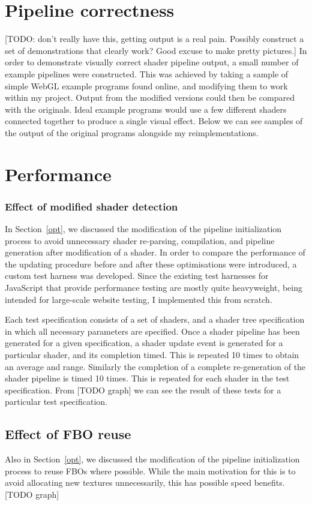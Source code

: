 \documentclass[12pt,twoside,notitlepage]{report}
\begin{document}
\section{Pipeline correctness}
[TODO: don't really have this, getting output is a real pain. Possibly construct a set of demonstrations that clearly work? Good excuse to make pretty pictures.]
In order to demonstrate visually correct shader pipeline output, a small number of example pipelines were constructed. This was achieved by taking a sample of simple WebGL example programs found online, and modifying them to work within my project. Output from the modified versions could then be compared with the originals. Ideal example programs would use a few different shaders connected together to produce a single visual effect. Below we can see samples of the output of the original programs alongside my reimplementations.

\section{Performance}
\subsubsection{Effect of modified shader detection}
In Section~\ref{opt}, we discussed the modification of the pipeline initialization process to avoid unnecessary shader re-parsing, compilation, and pipeline generation after modification of a shader. In order to compare the performance of the updating procedure before and after these optimisations were introduced, a custom test harness was developed. Since the existing test harnesses for JavaScript that provide performance testing are mostly quite heavyweight, being intended for large-scale website testing, I implemented this from scratch.

Each test specification consists of a set of shaders, and a shader tree specification in which all necessary parameters are specified. Once a shader pipeline has been generated for a given specification, a shader update event is generated for a particular shader, and its completion timed. This is repeated 10 times to obtain an average and range. Similarly the completion of a complete re-generation of the shader pipeline is timed 10 times. This is repeated for each shader in the test specification. From [TODO graph] we can see the result of these tests for a particular test specification.

\subsection{Effect of FBO reuse}
Also in Section~\ref{opt}, we discussed the modification of the pipeline initialization process to reuse FBOs where possible. While the main motivation for this is to avoid allocating new textures unnecessarily, this has possible speed benefits. [TODO graph]
\end{document}
